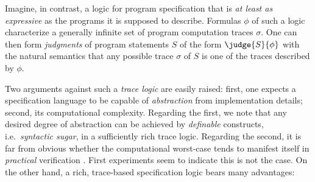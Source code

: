 \documentclass[a4paper,numberwithinsect]{lipics-v2021}
\begin{document}
Imagine, in contrast, a logic for program specification that is
\emph{at least as expressive} as the programs it is supposed to
describe. Formulas $\phi$ of such a logic characterize a generally
infinite set of program computation traces $\sigma$. One can then form
\emph{judgments} of program statements $S$ of the form
$\judge{S}{\phi}$ with the natural semantics that any possible trace
$\sigma$ of $S$ is one of the traces described by $\phi$.

Two arguments against such a \emph{trace logic} are easily raised:
first, one expects a specification language to be capable of
\emph{abstraction} from implementation details; second, its
computational complexity. Regarding the first, we note that any
desired degree of abstraction can be achieved by \emph{definable}
constructs, i.e.~\emph{syntactic sugar}, in a sufficiently rich trace
logic. Regarding the second, it is far from obvious whether the
computational worst-case tends to manifest itself in \emph{practical}
verification \cite{HaehnleHuisman19}. First experiments seem to
indicate this is not the case.
%
On the other hand, a rich, trace-based specification logic bears many
advantages:
%
\end{document}
